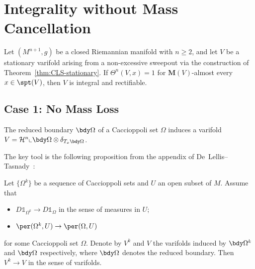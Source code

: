 \section{Integrality without Mass Cancellation}

\begin{theorem}\label{thm:integrality-mult-one}
    Let $(M^{n+1},g)$ be a closed Riemannian manifold with $n \geq 2$, and let $V$ be a
    stationary varifold arising from a non-excessive sweepout via the construction of
    Theorem~\ref{thm:CLS-stationary}. If $\Theta^n(V,x)=1$ for $\mathbf{M}(V)$-almost every
    $x\in\spt(V)$, then $V$ is integral and rectifiable.
\end{theorem}

\subsection{Case 1: No Mass Loss}

The reduced boundary $\bdy\Omega$ of a Caccioppoli set $\Omega$ induces a varifold
$V = \mathcal{H}^n \llcorner \bdy\Omega \otimes \delta_{T_x\bdy\Omega}$.

The key tool is the following proposition from the appendix of De~Lellis--Tasnady~\cite{DLT13}:

\begin{proposition}\label{prop:DLT-integrality}
    Let $\{\Omega^k\}$ be a sequence of Caccioppoli sets and $U$ an open subset of $M$. Assume that
    \begin{itemize}
        \item[(i)] $D\mathbb{1}_{\Omega^k} \to D\mathbb{1}_\Omega$ in the sense of measures in $U$;
        \item[(ii)] $\per(\Omega^k, U) \to \per(\Omega, U)$
    \end{itemize}
    for some Caccioppoli set $\Omega$. Denote by $V^k$ and $V$ the varifolds induced by $\bdy\Omega^k$
    and $\bdy\Omega$ respectively, where $\bdy\Omega$ denotes the reduced boundary. Then
    $V^k \to V$ in the sense of varifolds.
\end{proposition}

